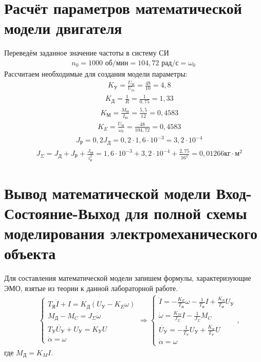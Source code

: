 \documentclass[fleqn, a4paper, 11pt, russian]{article}
\begin{document}
    \section{Расчёт параметров математической модели двигателя}
    Переведём заданное значение частоты в систему СИ
    \begin{align}
		n_0 = 1000 \text{ об/мин} = 104,72 \text{ рад/с} = \omega_0
    \end{align}
    Рассчитаем необходимые для создания модели параметры:
    \begin{align}
    	&&K_\text{У} = \frac{U_\text{Н}}{U_m} = \frac{48}{10} = 4,8
    \end{align}
    \begin{align}
    	&&K_\text{Д} = \frac{1}{R} = \frac{1}{0,75} = 1,33
    \end{align}
    \begin{align}
    	&&K_\text{М} = \frac{M_\text{Н}}{I_\text{Н}} = \frac{5,5}{12} = 0,4583
    \end{align}
    \begin{align}
    	&&K_E = \frac{U_\text{Н}}{\omega_0} = \frac{48}{104,72} = 0,4583
    \end{align}
    \begin{align}
    	&&J_\text{Р} = 0,2J_\text{Д} = 0,2 \cdot 1,6\cdot10^{-3} = 3,2\cdot10^{-4}
    \end{align}
    \begin{align}
    	&&J_\Sigma = J_\text{Д} + J_\text{Р} + \frac{J_\text{М}}{i_\text{Р}^2} = 1,6\cdot10^{-3} + 3,2\cdot10^{-4} + \frac{2,75}{16^2} = 0,01266 \text{кг}\cdot\text{м}^2
	\end{align}
	\clearpage
	\section{Вывод математической модели Вход-Состояние-Выход для полной схемы моделирования электромеханического объекта}
	Для составления математической модели запишем формулы, характеризующие ЭМО, взятые из теории к данной лабораторной работе.
	\begin{align}
		&&\begin{cases}
			T_\text{Я}\dot{I} + I = K_\text{Д}(U_\text{У} - K_E\omega)\\
			M_\text{Д} - M_C = J_\Sigma\dot{\omega}\\
			T_\text{У}\dot{U_\text{У}} + U_\text{У} = K_\text{У}U\\
			\dot{\alpha} = \omega
		\end{cases}
		\Rightarrow
		\begin{cases}
			\dot{I} = -\displaystyle{\frac{K_E}{T_\text{Я}}}\omega - \frac{1}{T_\text{Я}}I + \frac{K_\text{Д}}{T_\text{Я}}U_\text{У}\\
			\dot{\omega} = \displaystyle{\frac{K_M}{J_\Sigma}}I - \frac{1}{J_\Sigma}M_C\\
			\dot{U_\text{У}} = -\displaystyle{\frac{1}{T_\text{У}}U_\text{У}} + \frac{K_\text{У}}{T_\text{У}}U\\
			\dot{\alpha} = \omega
		\end{cases}
		,
		\label{ESETh}
	\end{align}
	где $M_\text{Д} = K_MI$.
	
\end{document}
